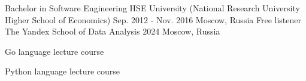 \begin{cventries}
  \cventry
    {Bachelor in Software Engineering} %
    {}
    {HSE University (National Research University Higher School of Economics)} %
    {}
    {Sep. 2012 - Nov. 2016} %
    {Moscow, Russia} %
    {}
  \cventry
    {Free listener} %
    {}
    {The Yandex School of Data Analysis} %
    {}
    {2024} %
    {Moscow, Russia} %
    {
      \begin{cvitems} %
        \item {Go language lecture course}
        \item {Python language lecture course}
      \end{cvitems}
    }
\end{cventries}
